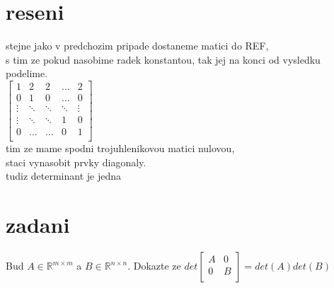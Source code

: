 \documentclass[a4paper]{article}
\begin{document}
\section*{reseni}
stejne jako v predchozim pripade dostaneme matici do REF, \\
s tim ze pokud nasobime radek konstantou, tak jej na konci od vysledku podelime.\\
$
\left[ \begin{matrix} 
	1 & 2 & 2 & \dots & 2 \\
	0 & 1 & 0 & \dots & 0 \\
	\vdots & \ddots & \ddots & \ddots & \vdots \\
	\vdots & \ddots & \ddots & 1 & 0 \\
	0 & \dots & \dots & 0 & 1 \\
\end{matrix} \right]
$\\
tim ze mame spodni trojuhlenikovou matici nulovou,\\
staci vynasobit prvky diagonaly.\\
tudiz determinant je jedna




\section*{zadani}
Bud $A\in\mathbb{R}^{m\times m}$ a $B\in\mathbb{R}^{n\times n}$.
Dokazte ze $
det
\left[ \begin{matrix} 
	A & 0 \\
	0 & B \\
\end{matrix} \right]
= det(A)det(B)
$ 
\end{document}

